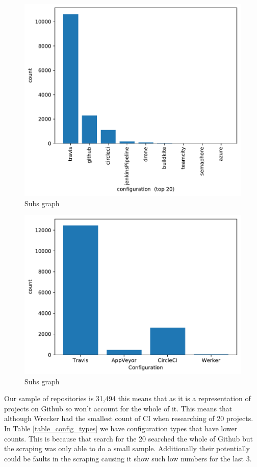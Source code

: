\documentclass[twoside,12pt,titlepage,a4paper]{article}
\begin{document}
\begin{figure}[!h]
  \centering
  \includegraphics[width=.8\textwidth]{../src/results/config-topn.pdf}
  \caption{Subs graph}
  \label{graph:config_bar}
\end{figure}

\begin{figure}[!h]
  \centering
  \includegraphics[width=.8\textwidth]{../src/results/comparison_config_bar.pdf}
  \caption{Subs graph}
  \label{graph:config_bar}
\end{figure}


Our sample of repositories is 31,494 this means that as it is a representation of projects on Github so won't account for the whole of it. This means that although Wrecker had the smallest count of CI when researching of 20 projects. In Table \ref{table_config_types} we have configuration types that have lower counts. This is because that search for the 20 searched the whole of Github but the scraping was only able to do a small sample. Additionally their potentially could be faults in the scraping causing it show such low numbers for the last 3. 
\end{document}
